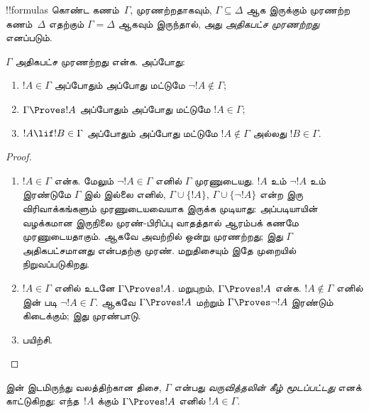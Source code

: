 \documentclass[../../../include/open-logic-section]{subfiles}
\begin{document}


\begin{defn}
!!{formula}s கொண்ட கணம்~$\Gamma$, முரணற்றதாகவும்,
$\Gamma \subseteq \Delta$ ஆக இருக்கும் முரணற்ற
கணம்~$\Delta$ எதற்கும் $\Gamma = \Delta$ ஆகவும்
இருந்தால், அது \emph{அதிகபட்ச முரணற்றது} எனப்படும்.
\end{defn}

\begin{lem}[மெய்மைத் துணைத்தேற்றம்]
$\Gamma$ அதிகபட்ச முரணற்றது என்க. அப்போது:
\begin{enumerate}
\item {} $!A \in \Gamma$ அப்போதும்
  அப்போது மட்டுமே $\lnot !A \notin \Gamma$;
\item {} $\Gamma \Proves !A$ அப்போதும்
  அப்போது மட்டுமே $!A \in \Gamma$;
\item {} $!A \lif !B \in \Gamma$
  அப்போதும் அப்போது மட்டுமே $!A \notin \Gamma$
  அல்லது $!B \in \Gamma$.
\end{enumerate}
\end{lem}

\begin{proof}
\begin{enumerate}
\item $!A \in \Gamma$ என்க. மேலும் $\lnot !A \in \Gamma$
  எனில் $\Gamma$ முரணுடையது. $!A$ உம்
  $\lnot!A$ உம் இரண்டுமே $\Gamma$ இல் இல்லை எனில்,
  $\Gamma\cup\{!A\}$, $\Gamma \cup \{\lnot !A\}$
  என்ற இரு விரிவாக்கங்களும் முரணுடையவையாக இருக்க
  முடியாது: அப்படியாயின் வழக்கமான இருநிலை
  முரண்-பிரிப்பு வாதத்தால் ஆரம்பக் கணமே முரணுடையதாகும்.
  ஆகவே அவற்றில் ஒன்று முரணற்றது; இது $\Gamma$
  அதிகபட்சமானது என்பதற்கு முரண். மறுதிசையும்
  இதே முறையில் நிறுவப்படுகிறது.

\item $!A \in \Gamma$ எனில் உடனே
  $\Gamma \Proves !A$. மறுபுறம், $\Gamma \Proves !A$
  என்க. $!A \notin \Gamma$ எனில்
   இன் படி $\lnot !A \in \Gamma$.
  ஆகவே $\Gamma \Proves !A$ மற்றும்
  $\Gamma \Proves \lnot !A$ இரண்டும் கிடைக்கும்;
  இது முரண்பாடு.
\item பயிற்சி.
\end{enumerate}
\end{proof}

 இன் இடமிருந்து
வலத்திற்கான திசை, $\Gamma$ என்பது
\emph{வருவித்தலின் கீழ் மூடப்பட்டது} எனக் காட்டுகிறது:
எந்த~$!A$ க்கும் $\Gamma \Proves !A$ எனில்
$!A \in \Gamma$.
\end{document}
